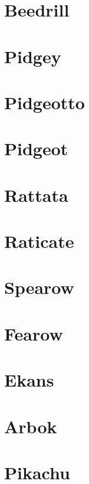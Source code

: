 \section{Beedrill}
\label{exp:Beedrill}
\section{Pidgey}
\label{exp:Pidgey}
\section{Pidgeotto}
\label{exp:Pidgeotto}
\section{Pidgeot}
\label{exp:Pidgeot}
\section{Rattata}
\label{exp:Rattata}
\section{Raticate}
\label{exp:Raticate}
\section{Spearow}
\label{exp:Spearow}
\section{Fearow}
\label{exp:Fearow}
\section{Ekans}
\label{exp:Ekans}
\section{Arbok}
\label{exp:Arbok}
\section{Pikachu}
\label{exp:Pikachu}
